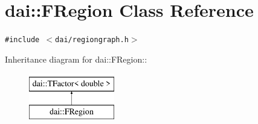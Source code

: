 \hypertarget{classdai_1_1FRegion}{
\section{dai::FRegion Class Reference}
\label{classdai_1_1FRegion}
}
{\tt \#include $<$dai/regiongraph.h$>$}

Inheritance diagram for dai::FRegion::\begin{figure}[H]
\begin{center}
\leavevmode
\includegraphics[height=2cm]{classdai_1_1FRegion}
\end{center}
\end{figure}


